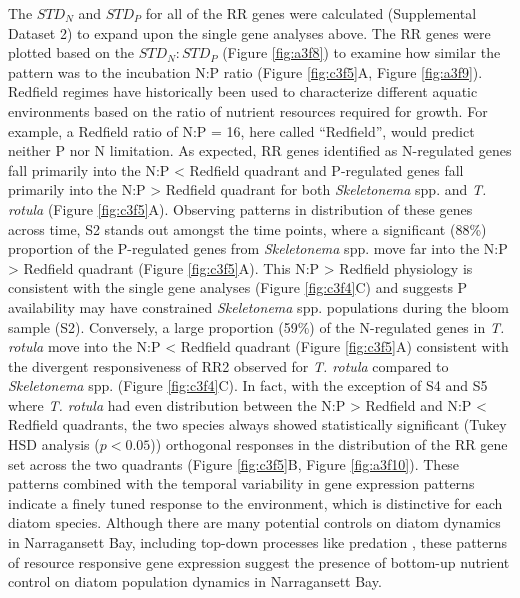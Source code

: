 The $STD_N$ and $STD_P$ for all of the RR genes were calculated (Supplemental Dataset 2) to expand upon the single gene analyses above. The RR genes were plotted based on the $STD_N : STD_P$ (Figure \ref{fig:a3f8}) to examine how similar the pattern was to the incubation N:P ratio (Figure \ref{fig:c3f5}A, Figure \ref{fig:a3f9}). Redfield regimes have historically been used to characterize different aquatic environments based on the ratio of nutrient resources required for growth. For example, a Redfield ratio of N:P = 16, here called “Redfield”, would predict neither P nor N limitation. As expected, RR genes identified as N-regulated genes fall primarily into the N:P < Redfield quadrant and P-regulated genes fall primarily into the N:P > Redfield quadrant for both \textit{Skeletonema} spp. and \textit{T. rotula} (Figure \ref{fig:c3f5}A). Observing patterns in distribution of these genes across time, S2 stands out amongst the time points, where a significant (88\%) proportion of the P-regulated genes from \textit{Skeletonema} spp. move far into the N:P > Redfield quadrant (Figure \ref{fig:c3f5}A). This N:P > Redfield physiology is consistent with the single gene analyses (Figure \ref{fig:c3f4}C) and suggests P availability may have constrained \textit{Skeletonema} spp. populations during the bloom sample (S2). Conversely, a large proportion (59\%) of the N-regulated genes in \textit{T. rotula} move into the N:P < Redfield quadrant (Figure \ref{fig:c3f5}A) consistent with the divergent responsiveness of RR2 observed for \textit{T. rotula} compared to \textit{Skeletonema} spp. (Figure \ref{fig:c3f4}C). In fact, with the exception of S4 and S5 where \textit{T. rotula} had even distribution between the N:P > Redfield and N:P < Redfield quadrants, the two species always showed statistically significant (Tukey HSD analysis ($p<0.05$)) orthogonal responses in the distribution of the RR gene set across the two quadrants (Figure \ref{fig:c3f5}B, Figure \ref{fig:a3f10}). These patterns combined with the temporal variability in gene expression patterns indicate a finely tuned response to the environment, which is distinctive for each diatom species. Although there are many potential controls on diatom dynamics in Narragansett Bay, including top-down processes like predation \citep{Martin1970, Lawerence2012}, these patterns of resource responsive gene expression suggest the presence of bottom-up nutrient control on diatom population dynamics in Narragansett Bay.\par

